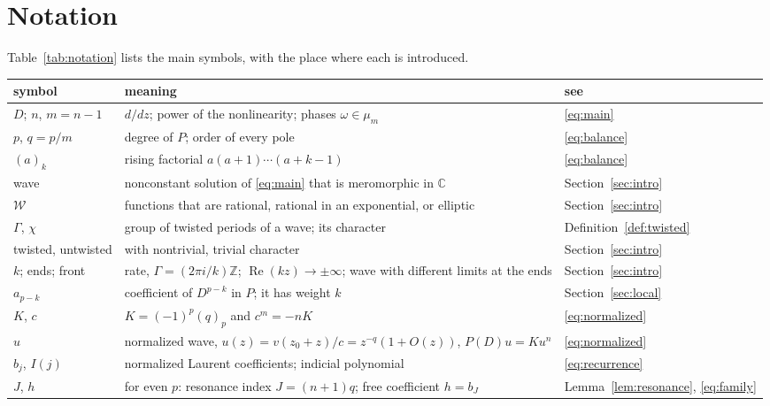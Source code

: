\documentclass[11pt]{article}
\theoremstyle{definition}
\theoremstyle{remark}
\numberwithin{equation}{section}
\newcommand{\CC}{\mathbb C}
\newcommand{\ZZ}{\mathbb Z}
\newcommand{\Wclass}{\mathcal W}
\begin{document}
\appendix

\section{Notation}\label{app:notation}

Table~\ref{tab:notation} lists the main symbols, with the place where
each is introduced.

\begin{table}[H]
\centering
\small
\begin{tabular}{@{}l@{\hspace{1em}}>{\raggedright\arraybackslash}p{}@{\hspace{1em}}l@{}}
\toprule
symbol & meaning & see\\
\midrule
\(D\); \(n\), \(m=n-1\) & \(d/dz\); power of the nonlinearity; phases \(\omega\in\mu_m\) & \eqref{eq:main}\\
\(p\), \(q=p/m\) & degree of \(P\); order of every pole & \eqref{eq:balance}\\
\((a)_k\) & rising factorial \(a(a+1)\cdots(a+k-1)\) & \eqref{eq:balance}\\
wave & nonconstant solution of \eqref{eq:main} that is meromorphic in \(\CC\) & Section~\ref{sec:intro}\\
\(\Wclass\) & functions that are rational, rational in an exponential, or elliptic & Section~\ref{sec:intro}\\
\(\Gamma\), \(\chi\) & group of twisted periods of a wave; its character & Definition~\ref{def:twisted}\\
twisted, untwisted & with nontrivial, trivial character & Section~\ref{sec:intro}\\
\(k\); ends; front & rate, \(\Gamma=(2\pi i/k)\ZZ\); \(\operatorname{Re}(kz)\to\pm\infty\); wave with different limits at the ends & Section~\ref{sec:intro}\\
\(a_{p-k}\) & coefficient of \(D^{p-k}\) in \(P\); it has weight \(k\) & Section~\ref{sec:local}\\
\(K\), \(c\) & \(K=(-1)^p(q)_p\) and \(c^m=-nK\) & \eqref{eq:normalized}\\
\(u\) & normalized wave, \(u(z)=v(z_0+z)/c=z^{-q}(1+O(z))\), \(P(D)u=Ku^n\) & \eqref{eq:normalized}\\
\(b_j\), \(I(j)\) & normalized Laurent coefficients; indicial polynomial & \eqref{eq:recurrence}\\
\(J\), \(h\) & for even \(p\): resonance index \(J=(n+1)q\); free coefficient \(h=b_J\) & Lemma~\ref{lem:resonance}, \eqref{eq:family}\\

\end{tabular}
\end{table}
\end{document}
